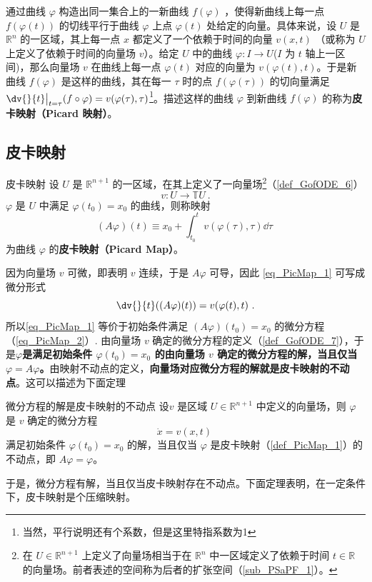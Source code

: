 
\cite{Arnold}通过曲线 $\varphi$ 构造出同一集合上的一新曲线 $f(\varphi)$ ，使得新曲线上每一点 $f(\varphi(t))$ 的切线平行于曲线 $\varphi$ 上点 $\varphi(t)$ 处给定的向量。具体来说，设 $U$ 是 $\mathbb R^n$ 的一区域，其上每一点 $x$ 都定义了一个依赖于时间的向量 $v(x,t)$ （或称为 $U$ 上定义了依赖于时间的向量场 $v$）。给定 $U$ 中的曲线 $\varphi:I\rightarrow U$($I$ 为 $t$ 轴上一区间)，那么向量场 $v$ 在曲线上每一点 $\varphi(t)$ 对应的向量为 $v(\varphi(t),t)$。于是新曲线 $f(\varphi)$ 是这样的曲线，其在每一 $\tau$ 时的点 $f(\varphi(\tau))$ 的切向量满足 $\dv{}{t}\big|_{t=\tau}(f\circ \varphi)=v(\varphi(\tau),\tau)$\footnote{当然，平行说明还有个系数，但是这里特指系数为1}。描述这样的曲线 $\varphi$ 到新曲线 $f(\varphi)$ 的称为\textbf{皮卡映射（Picard 映射）}。
\subsection{皮卡映射}
\begin{definition}{皮卡映射}\label{def_PicMap_1}
设 $U$ 是 $\mathbb R^{n+1}$ 的一区域，在其上定义了一向量场\footnote{在 $U\in\mathbb R^{n+1}$ 上定义了向量场相当于在 $\mathbb R^n$ 中一区域定义了依赖于时间 $t\in\mathbb R$ 的向量场。前者表述的空间称为后者的扩张空间（\autoref{sub_PSaPF_1}）。}（\autoref{def_GofODE_6}） 
\begin{equation}
v:U\rightarrow\mathbb TU~.
\end{equation}
$\varphi$ 是 $U$ 中满足 $\varphi(t_0)=x_0$ 的曲线，则称映射
\begin{equation}\label{eq_PicMap_1}
(A\varphi)(t)\equiv x_0+\int_{t_0}^{t}v(\varphi(\tau),\tau)\dd \tau~
\end{equation}
为曲线 $\varphi$ 的\textbf{皮卡映射（Picard Map）}。
\end{definition}

因为向量场 $v$ 可微，即表明 $v$ 连续，于是 $A\varphi$ 可导，因此 \autoref{eq_PicMap_1} 可写成微分形式
\begin{equation}\label{eq_PicMap_2}
\dv{}{t}((A\varphi)(t))=v(\varphi(t),t)~.
\end{equation}
所以\autoref{eq_PicMap_1} 等价于初始条件满足 $(A\varphi)(t_0)=x_0$ 的微分方程（\autoref{eq_PicMap_2}）. 由向量场 $v$ 确定的微分方程的定义（\autoref{def_GofODE_7}），于是\textbf{$\varphi$是满足初始条件 $\varphi(t_0)=x_0$ 的由向量场 $v$ 确定的微分方程的解，当且仅当 $\varphi=A\varphi$。}由映射不动点的定义，\textbf{向量场对应微分方程的解就是皮卡映射的不动点}。这可以描述为下面定理
\begin{theorem}{微分方程的解是皮卡映射的不动点}\label{the_PicMap_1}
设$v$ 是区域 $U\in\mathbb R^{n+1}$ 中定义的向量场，则 $\varphi$ 是 $v$ 确定的微分方程
\begin{equation}\label{eq_PicMap_3}
\dot x=v(x,t)~
\end{equation}
满足初始条件 $\varphi(t_0)=x_0$ 的解，当且仅当 $\varphi$ 是皮卡映射（\autoref{def_PicMap_1}）的不动点，即 $A\varphi=\varphi$。
\end{theorem}
于是，微分方程有解，当且仅当皮卡映射存在不动点。下面定理表明，在一定条件下，皮卡映射是个压缩映射。

